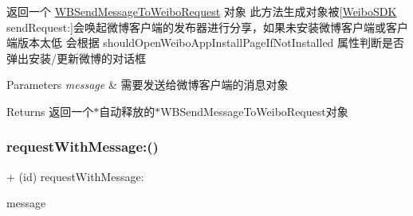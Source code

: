 返回一个 \mbox{\hyperlink{interface_w_b_send_message_to_weibo_request}{W\+B\+Send\+Message\+To\+Weibo\+Request}} 对象 此方法生成对象被\mbox{[}\mbox{\hyperlink{interface_weibo_s_d_k}{Weibo\+S\+DK}} send\+Request\+:\mbox{]}会唤起微博客户端的发布器进行分享，如果未安装微博客户端或客户端版本太低 会根据 should\+Open\+Weibo\+App\+Install\+Page\+If\+Not\+Installed 属性判断是否弹出安装/更新微博的对话框 
\begin{DoxyParams}{Parameters}
{\em message} & 需要发送给微博客户端的消息对象 \\
\hline
\end{DoxyParams}
\begin{DoxyReturn}{Returns}
返回一个$\ast$自动释放的$\ast$\+W\+B\+Send\+Message\+To\+Weibo\+Request对象 
\end{DoxyReturn}
\mbox{\label{interface_w_b_send_message_to_weibo_request_af6ff893011c578e7351d4f35b542fb41}} 
\subsubsection{\texorpdfstring{request\+With\+Message\+:()}{requestWithMessage:()}\hspace{0.1cm}{\footnotesize\ttfamily [3/3]}}
{\footnotesize\ttfamily + (id) request\+With\+Message\+: \begin{DoxyParamCaption}\item[{(\mbox{\hyperlink{interface_w_b_message_object}{W\+B\+Message\+Object}} $\ast$)}]{message }\end{DoxyParamCaption}}

